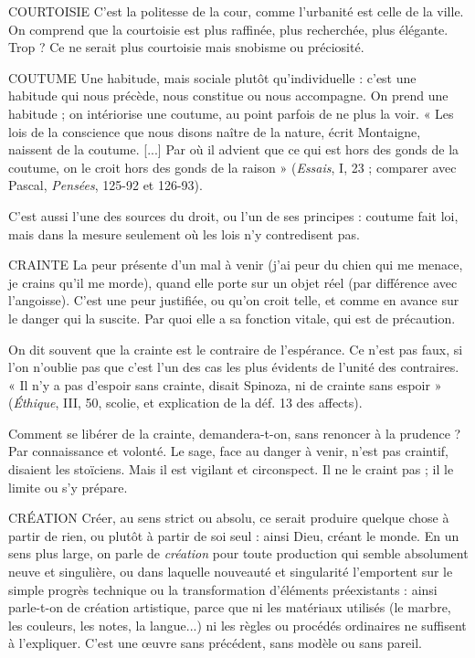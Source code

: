 COURTOISIE C'est la politesse de la cour, comme l’urbanité est celle de
la ville. On comprend que la courtoisie est plus raffinée,
plus recherchée, plus élégante. Trop ? Ce ne serait plus courtoisie mais snobisme
ou préciosité.

COUTUME Une habitude, mais sociale plutôt qu’individuelle : c’est une
habitude qui nous précède, nous constitue ou nous accompagne.
On prend une habitude ; on intériorise une coutume, au point parfois
de ne plus la voir. « Les lois de la conscience que nous disons naître de la
nature, écrit Montaigne, naissent de la coutume. [...] Par où il advient que ce
qui est hors des gonds de la coutume, on le croit hors des gonds de la raison »
({\it Essais}, I, 23 ; comparer avec Pascal, {\it Pensées}, 125-92 et 126-93).

C’est aussi l’une des sources du droit, ou l’un de ses principes : coutume
fait loi, mais dans la mesure seulement où les lois n’y contredisent pas.

CRAINTE La peur présente d’un mal à venir (j'ai peur du chien qui me
menace, je crains qu’il me morde), quand elle porte sur un objet
réel (par différence avec l'angoisse). C’est une peur justifiée, ou qu’on croit
telle, et comme en avance sur le danger qui la suscite. Par quoi elle a sa fonction
vitale, qui est de précaution.

On dit souvent que la crainte est le contraire de l’espérance. Ce n’est pas
faux, si l’on n’oublie pas que c’est l’un des cas les plus évidents de l’unité des
contraires. « Il n’y a pas d’espoir sans crainte, disait Spinoza, ni de crainte sans
espoir » ({\it Éthique}, III, 50, scolie, et explication de la déf. 13 des affects).

Comment se libérer de la crainte, demandera-t-on, sans renoncer à la
prudence ? Par connaissance et volonté. Le sage, face au danger à venir, n’est
pas craintif, disaient les stoïciens. Mais il est vigilant et circonspect. Il ne le
craint pas ; il le limite ou s’y prépare.

CRÉATION Créer, au sens strict ou absolu, ce serait produire quelque chose
à partir de rien, ou plutôt à partir de soi seul : ainsi Dieu,
créant le monde. En un sens plus large, on parle de {\it création} pour toute production
qui semble absolument neuve et singulière, ou dans laquelle nouveauté et
singularité l’emportent sur le simple progrès technique ou la transformation
d'éléments préexistants : ainsi parle-t-on de création artistique, parce que ni les
matériaux utilisés (le marbre, les couleurs, les notes, la langue...) ni les règles
ou procédés ordinaires ne suffisent à l’expliquer. C’est une œuvre sans précédent,
sans modèle ou sans pareil.

